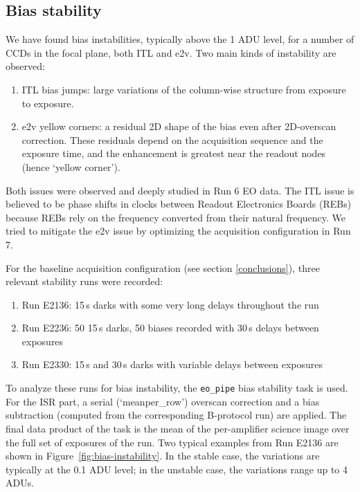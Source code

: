 
\subsection{Bias stability}\label{sec:bias-stability-2}

We have found bias instabilities, typically above the 1 ADU level, for a number of CCDs in the focal plane, both ITL and e2v. Two main kinds of instability are observed:

\begin{enumerate}
\tightlist
\item
  ITL bias jumps: large variations of the column-wise structure from
  exposure to exposure.
\item
  e2v yellow corners: a residual 2D shape of the bias even after
  2D-overscan correction. These residuals depend on the acquisition
  sequence and the exposure time, and the enhancement is greatest near the readout nodes (hence `yellow corner').
\end{enumerate}

Both issues were observed and deeply studied in Run 6 EO data. The ITL
issue is believed to be phase shifts in clocks between Readout
Electronics Boards (REBs) because REBs rely on the frequency converted
from their natural frequency. We tried to mitigate the e2v issue by
optimizing the acquisition configuration in Run 7.

For the baseline acquisition configuration (see section \ref{conclusions}), three
relevant stability runs were recorded:

\begin{enumerate}
\tightlist
\item
  Run E2136: 15\,s darks with some very long delays throughout the run
\item
  Run E2236: 50 15\,s darks, 50 biases recorded with 30\,s delays between
  exposures
\item
  Run E2330: 15\,s and 30\,s darks with variable delays between exposures
\end{enumerate}

To analyze these runs for bias instability, the {\tt eo\_pipe} bias
stability task is used.  For the ISR part, a serial
(`meanper\_row')
overscan correction and a bias subtraction (computed from the
corresponding B-protocol run) are applied. The final data product of the task is the
mean of the per-amplifier science image over the full set of exposures
of the run. Two typical examples from Run E2136 are shown in Figure~\ref{fig:bias-instability}. In the stable case, the variations are typically at the 0.1 ADU
level; in the unstable case, the variations range up to 4 ADUs.

